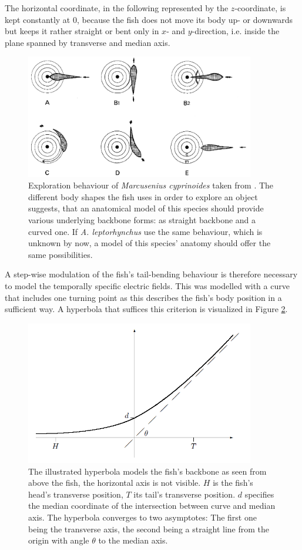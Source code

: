 The horizontal coordinate, in the following represented by the $z$-coordinate, is kept constantly at $0$, because the fish does not move its body up- or downwards but keeps it rather straight or bent only in $x$- and $y$-direction, i.e. inside the plane spanned by transverse and median axis. 

\begin{figure}
   \centering
   \includegraphics[width=10cm]{figures/ExplorationBehaviour.png}
   \caption{Exploration behaviour of \textit{Marcusenius cyprinoides} taken from \cite{toerring1979motor}. The different body shapes the fish uses in order to explore an object suggests, that an anatomical model of this species should provide various underlying backbone forms: as straight backbone and a curved one. If \textit{A. leptorhynchus} use the same behaviour, which is unknown by now, a model of this species' anatomy should offer the same possibilities. }
   \label{ExplorationBehaviour}
\end{figure}

A step-wise modulation of the fish's tail-bending behaviour is therefore necessary to model the temporally specific electric fields.
This was modelled with a curve that includes one turning point as this describes the fish's body position in a sufficient way. A hyperbola that suffices this criterion is visualized in Figure \ref{Backbonefunction}.
\begin{figure}[ht]
   \centering
   \includegraphics[width=10cm]{figures/BackboneFunction.PNG}
   \caption{The illustrated hyperbola models the fish's backbone as seen from above the fish, the horizontal axis is not visible. $H$ is the fish's head's transverse position, $T$ its tail's transverse position. $d$ specifies the median coordinate of the intersection between curve and median axis. The hyperbola converges to two asymptotes: The first one being the transverse axis, the second being a straight line from the origin with angle $\theta$ to the median axis.}
   \label{Backbonefunction}
\end{figure}

